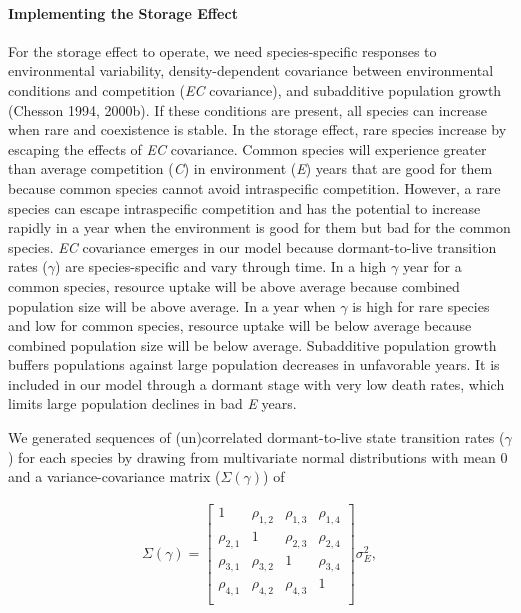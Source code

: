 \documentclass[12pt,]{article}
\let\oldparagraph\paragraph
\renewcommand{\paragraph}[1]{\oldparagraph{#1}\mbox{}}
\begin{document}
\paragraph{Implementing the Storage
Effect}\label{implementing-the-storage-effect}

For the storage effect to operate, we need species-specific responses to
environmental variability, density-dependent covariance between
environmental conditions and competition (\emph{EC} covariance), and
subadditive population growth (Chesson 1994, 2000b). If these conditions
are present, all species can increase when rare and coexistence is
stable. In the storage effect, rare species increase by escaping the
effects of \emph{EC} covariance. Common species will experience greater
than average competition (\emph{C}) in environment (\emph{E}) years that
are good for them because common species cannot avoid intraspecific
competition. However, a rare species can escape intraspecific
competition and has the potential to increase rapidly in a year when the
environment is good for them but bad for the common species. \emph{EC}
covariance emerges in our model because dormant-to-live transition rates
(\(\gamma\)) are species-specific and vary through time. In a high
\(\gamma\) year for a common species, resource uptake will be above
average because combined population size will be above average. In a
year when \(\gamma\) is high for rare species and low for common
species, resource uptake will be below average because combined
population size will be below average. Subadditive population growth
buffers populations against large population decreases in unfavorable
years. It is included in our model through a dormant stage with very low
death rates, which limits large population declines in bad \emph{E}
years.

We generated sequences of (un)correlated dormant-to-live state
transition rates (\(\gamma\)) for each species by drawing from
multivariate normal distributions with mean 0 and a variance-covariance
matrix (\(\Sigma(\gamma)\)) of \vspace{-3em}

\begin{align}
\Sigma(\gamma) = 
\begin{bmatrix}
1 & \rho_{1,2} & \rho_{1,3} & \rho_{1,4} \\
\rho_{2,1} & 1 & \rho_{2,3} & \rho_{2,4} \\
\rho_{3,1} & \rho_{3,2} & 1  & \rho_{3,4} \\
\rho_{4,1} & \rho_{4,2} & \rho_{4,3} & 1  \\
\end{bmatrix}
\sigma_{E}^2,
\end{align}\vspace{-2em}
\end{document}
